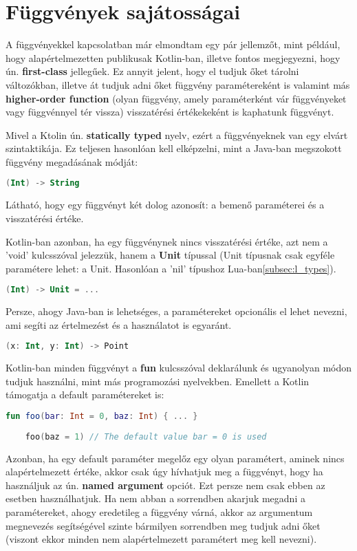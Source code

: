 \section{Függvények sajátosságai}
\label{sec:k_func}

A függvényekkel kapcsolatban már elmondtam egy pár jellemzőt, mint például, hogy alapértelmezetten publikusak Kotlin-ban, illetve fontos megjegyezni, hogy ún. \textbf{first-class} jellegűek. Ez annyit jelent, hogy el tudjuk őket tárolni változókban, illetve át tudjuk adni őket függvény paramétereként is valamint más \textbf{higher-order function} (olyan függvény, amely paraméterként vár függvényeket vagy függvénnyel tér vissza) visszatérési értékekeként is kaphatunk függvényt.

Mivel a Ktolin ún. \textbf{statically typed} nyelv, ezért a függvényeknek van egy elvárt szintaktikája. Ez teljesen hasonlóan kell elképzelni, mint a Java-ban megszokott függvény megadásának módját:
\scriptsize
\begin{lstlisting}[language = Kotlin]
	(Int) -> String
\end{lstlisting}
\normalsize
Látható, hogy egy függvényt két dolog azonosít: a bemenő paraméterei és a visszatérési értéke. 

\newpage

Kotlin-ban azonban, ha egy függvénynek nincs visszatérési értéke, azt nem a 'void' kulcsszóval jelezzük, hanem a \textbf{Unit} típussal (Unit típusnak csak egyféle paramétere lehet: a Unit. Hasonlóan a 'nil' típushoz Lua-ban\ref{subsec:l_types}).
\scriptsize
\begin{lstlisting}[language = Kotlin]
	(Int) -> Unit = ...
\end{lstlisting}
\normalsize
Persze, ahogy Java-ban is lehetséges, a paramétereket opcionális el lehet nevezni, ami segíti az értelmezést és a használatot is egyaránt.
\scriptsize
\begin{lstlisting}[language = Kotlin]
	(x: Int, y: Int) -> Point
\end{lstlisting}
\normalsize
Kotlin-ban minden függvényt a \textbf{fun} kulcsszóval deklarálunk és ugyanolyan módon tudjuk használni, mint más programozási nyelvekben. Emellett a Kotlin támogatja a default paramétereket is:
\scriptsize
\begin{lstlisting}[language = Kotlin]
	fun foo(bar: Int = 0, baz: Int) { ... }
	
	foo(baz = 1) // The default value bar = 0 is used
\end{lstlisting}
\normalsize
Azonban, ha egy default paraméter megelőz egy olyan paramétert, aminek nincs alapértelmezett értéke, akkor csak úgy hívhatjuk meg a függvényt, hogy ha használjuk az ún. \textbf{named argument} opciót. Ezt persze nem csak ebben az esetben használhatjuk. Ha nem abban a sorrendben akarjuk megadni a paramétereket, ahogy eredetileg a függvény várná, akkor az argumentum megnevezés segítségével szinte bármilyen sorrendben meg tudjuk adni őket (viszont ekkor minden nem alapértelmezett paramétert meg kell nevezni).

